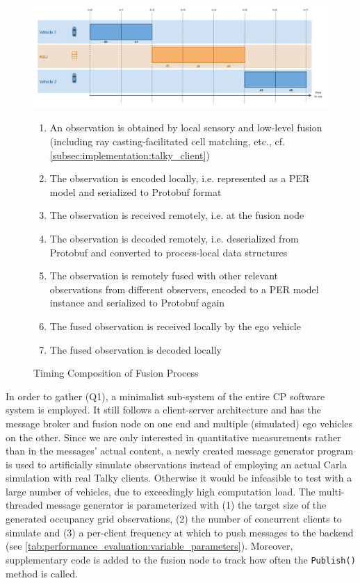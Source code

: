 \begin{figure}[h]
	\centering
	\includegraphics[width=1\linewidth]{98_images/communication_timeline}
	\caption{Timing Composition of Fusion Process}
	\label{fig:communication_timeline}
	\medskip
	\small
	\begin{enumerate}[t = 1:\ ]
		\item An observation is obtained by local sensory and low-level fusion (including ray casting-facilitated cell matching, etc., cf. \cref{subsec:implementation:talky_client}) \\
		\item The observation is encoded locally, i.e. represented as a PER model and serialized to Protobuf format
		\item The observation is received remotely, i.e. at the fusion node
		\item The observation is decoded remotely, i.e. deserialized from Protobuf and converted to process-local data structures
		\item The observation is remotely fused with other relevant observations from different observers, encoded to a PER model instance and serialized to Protobuf again
		\item The fused observation is received locally by the ego vehicle
		\item The fused observation is decoded locally
	\end{enumerate}
\end{figure}

In order to gather (Q1), a minimalist sub-system of the entire CP software system is employed. It still follows a client-server architecture and has the message broker and fusion node on one end and multiple (simulated) ego vehicles on the other. Since we are only interested in quantitative measurements rather than in the messages' actual content, a newly created message generator program is used to artificially simulate observations instead of employing an actual Carla simulation with real Talky clients. Otherwise it would be infeasible to test with a large number of vehicles, due to exceedingly high computation load. The multi-threaded message generator is parameterized with (1) the target size of the generated occupancy grid observations, (2) the number of concurrent clients to simulate and (3) a per-client frequency at which to push messages to the backend (see \cref{tab:performance_evaluation:variable_parameters}). Moreover, supplementary code is added to the fusion node to track how often the \texttt{Publish()} method is called.

